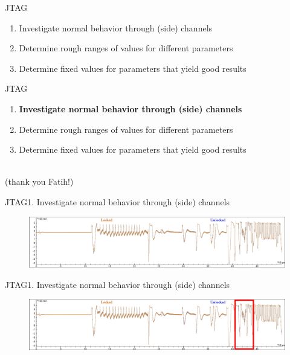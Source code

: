 \documentclass[table]{beamer}
\begin{document}
\begin{frame}{JTAG}
    \begin{enumerate}
        \item Investigate normal behavior through (side) channels 
        \item Determine rough ranges of values for different parameters
        \item Determine fixed values for parameters that yield good results
    \end{enumerate}
\end{frame}


\begin{frame}{JTAG}
    \begin{enumerate}
        \item \textbf{Investigate normal behavior through (side) channels} 
        \item Determine rough ranges of values for different parameters
        \item Determine fixed values for parameters that yield good results
    \end{enumerate}

    \ \\
    (thank you Fatih!)
\end{frame}


\begin{frame}{JTAG}{1. Investigate normal behavior through (side) channels }
    \begin{figure}[H]
      \centering
      \includegraphics[width=\textwidth]{../plots/tms57-trace1.png}
    \end{figure}
\end{frame}

\begin{frame}{JTAG}{1. Investigate normal behavior through (side) channels }
    \begin{figure}[H]
      \centering
      \includegraphics[width=\textwidth]{../plots/tms57-trace1-2.png}
    \end{figure}
\end{frame}
\end{document}
